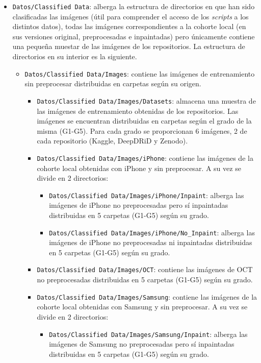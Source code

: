 \begin{itemize}
\begin{itemize}
    \end{itemize}
    \item \texttt{Datos/Classified Data}: alberga la estructura de directorios en que han sido clasificadas las imágenes (útil para comprender el acceso de los \textit{scripts} a los distintos datos), todas las imágenes correspondientes a la cohorte local (en sus versiones original, preprocesadas e inpaintadas) pero únicamente contiene una pequeña muestar de las imágenes de los repositorios. La estructura de directorios en su interior es la siguiente.
    \begin{itemize}
        \item \texttt{Datos/Classified Data/Images}: contiene las imágenes de entrenamiento sin preprocesar distribuidas en carpetas según su origen.
        \begin{itemize}
            \item \texttt{Datos/Classified Data/Images/Datasets}: almacena una muestra de las imágenes de entrenamiento obtenidas de los repositorios. Las imágenes se encuentran distribuidas en carpetas según el grado de la misma (G1-G5). Para cada grado se proporcionan 6 imágenes, 2 de cada repositorio (Kaggle, DeepDRiD y Zenodo).
            \item \texttt{Datos/Classified Data/Images/iPhone}: contiene las imágenes de la cohorte local obtenidas con iPhone y sin preprocesar. A su vez se divide en 2 directorios:
            \begin{itemize}
                \item \texttt{Datos/Classified Data/Images/iPhone/Inpaint}: alberga las imágenes de iPhone no preprocesadas pero sí inpaintadas distribuidas en 5 carpetas (G1-G5) según su grado.
                \item \texttt{Datos/Classified Data/Images/iPhone/No\_Inpaint}: alberga las imágenes de iPhone no preprocesadas ni inpaintadas distribuidas en 5 carpetas (G1-G5) según su grado.
            \end{itemize}
            \item \texttt{Datos/Classified Data/Images/OCT}: contiene las imágenes de OCT no preprocesadas distribuidas en 5 carpetas (G1-G5) según su grado.
             \item \texttt{Datos/Classified Data/Images/Samsung}: contiene las imágenes de la cohorte local obtenidas con Samsung y sin preprocesar. A su vez se divide en 2 directorios:
            \begin{itemize}
                \item \texttt{Datos/Classified Data/Images/Samsung/Inpaint}: alberga las imágenes de Samsung no preprocesadas pero sí inpaintadas distribuidas en 5 carpetas (G1-G5) según su grado.

\end{itemize}
\end{itemize}
\end{itemize}
\end{itemize}
